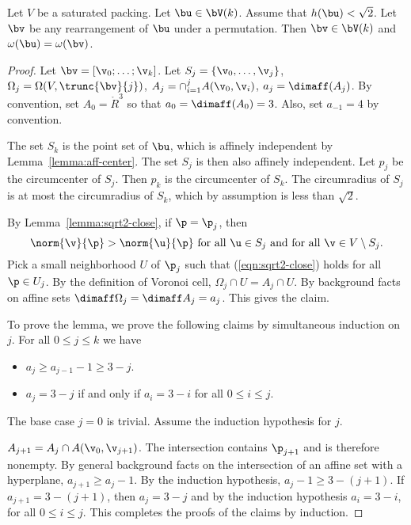 \begin{lemma}[]   \label{lemma:perm-Vk} 
  Let $V$ be a saturated packing.  Let $\bu\in \bV(k)$.  Assume that
  $h(\bu)<\sqrt2$. Let $\bv$ be any rearrangement of $\bu$ under a
  permutation.  Then $\bv\in \bV(k)$ and $\omega(\bu) = \omega(\bv)$.
\end{lemma}

\begin{proof} 
Let $\bv = [\v_0;\ldots;\v_k]$.  Let $S_j = \{\v_0,\ldots,\v_j\}$,  $\Omega_j = \Omega(V,\trunc{\bv}{j})$, $A_j=\cap_{i=1}^j A(\v_0,\v_i)$, $a_j = \dimaff(A_j)$.
By convention, set $A_0 = \ring{R}^3$ so that $a_0=\dimaff(A_0) = 3$.
Also, set $a_{-1} = 4$ by convention.

The set $S_k$ is the point set of $\bu$,
which is affinely independent by Lemma~\ref{lemma:aff-center}.  The set $S_j$ is then also affinely independent.  Let $p_j$ be the circumcenter of $S_j$.  Then $p_k$ is the
circumcenter of $S_k$.  The circumradius of $S_j$ is at most the circumradius of $S_k$,
which by assumption is less than $\sqrt2$.

By Lemma~\ref{lemma:sqrt2-close}, if $\p=\p_j$, then
\begin{equation}\label{eqn:sqrt2-close} 
\norm{\v}{\p} > \norm{\u}{\p}\text{ for all }\u\in S_j
\text{ and for all }\v\in V\setminus S_j.
\end{equation}   
Pick a small neighborhood $U$ of $\p_j$ such that (\ref{eqn:sqrt2-close}) holds
for all $\p\in U_j$.  By the definition of Voronoi cell, $\Omega_j \cap U=A_j\cap U$.
By background facts on affine sets $\dimaff\Omega_j = \dimaff A_j=a_j$.  This gives
the claim.

To prove the lemma, we prove the following claims by simultaneous induction on $j$.
For all $0\le j\le k$ we have
\begin{itemize} 
\item $a_j \ge a_{j-1} - 1\ge 3-j$.
\item $a_j = 3-j$ if and only if $a_i=3-i$ for all $0\le i\le j$.
\end{itemize}
The base case $j=0$ is trivial.  Assume the induction hypothesis for $j$.

$A_{j+1} = A_{j}\cap A(\v_0,\v_{j+1})$.  The intersection contains $\p_{j+1}$ and is therefore
nonempty.  By general background facts on the intersection of an
affine set with a hyperplane, $a_{j+1} \ge a_{j}-1$.  By the induction hypothesis,
$a_{j}-1\ge 3-(j+1)$.
If $a_{j+1}=3-(j+1)$, then $a_{j}=3-j$ and by the induction hypothesis
$a_{i}=3-i$, for all $0\le i\le j$. This completes the proofs of the claims by induction.


\end{proof}
